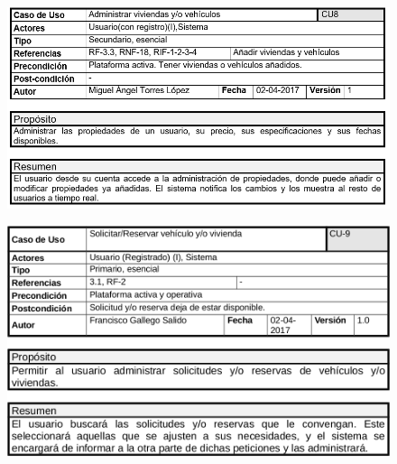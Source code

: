 	\begin{figure}[h!]
		\centering
		\includegraphics[width=0.9\linewidth]{img/casos/usuarios/Gestion_usuarios_administrar_propiedades}
		\label{fig:gestionusuariosadministrarpropiedades}
	\end{figure}
\clearpage
	\begin{figure}[h!]
		\centering
		\includegraphics[width=0.9\linewidth]{img/casos/solicitudes_reservas/Caso_solicitud_reserva}
		\label{fig:casosolicitudreserva}
	\end{figure}
	
